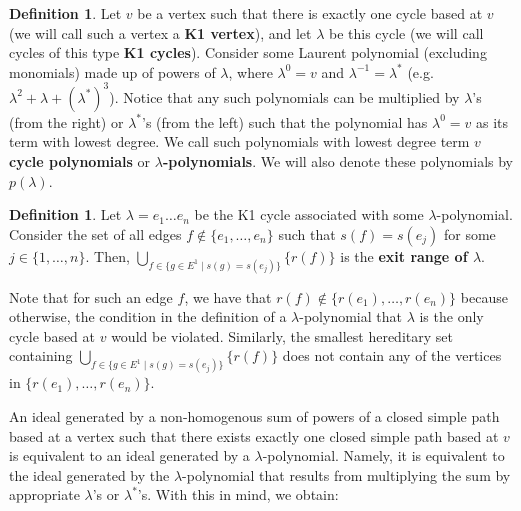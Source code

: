\documentclass[12pt]{amsart}
\theoremstyle{plain} \numberwithin{equation}{section}
\theoremstyle{definition}
\newtheorem{definition}[theorem]{Definition}
\theoremstyle{definition}
\begin{document}
\begin{definition}
   Let $v$ be a vertex such that there is exactly one cycle based at $v$ (we will call such a vertex a \textbf{K1 vertex}), and let $\lambda$ be this cycle (we will call cycles of this type \textbf{K1 cycles}). Consider some Laurent polynomial (excluding monomials) made up of powers of $\lambda$, where $\lambda^0 = v$ and $\lambda^{-1}=\lambda^*$ (e.g. $\lambda^2 + \lambda + (\lambda^*)^3$). Notice that any such polynomials can be multiplied by $\lambda$'s (from the right) or $\lambda^*$'s (from the left) such that the polynomial has $\lambda^0=v$ as its term with lowest degree. We call such polynomials with lowest degree term $v$ \textbf{cycle polynomials} or \textbf{$\lambda$-polynomials}. We will also denote these polynomials by $p(\lambda)$. 
\end{definition} 

\begin{definition}
    Let $\lambda = e_1\dots e_n$ be the K1 cycle associated with some $\lambda$-polynomial. Consider the set of all edges $f \notin \{e_1,\ldots,e_n\}$ such that $s(f) = s(e_j)$ for some $j \in\{1,\ldots,n\}$. Then, $\bigcup_{f\in\{g\in E^1 \mid s(g) = s(e_j)\}}\{r(f)\}$ is the \textbf{exit range of $\lambda$}.
\end{definition} 

Note that for such an edge $f$, we have that $r(f) \notin \{r(e_1),\ldots,r(e_n)\}$ because otherwise, the condition in the definition of a $\lambda$-polynomial that $\lambda$ is the only cycle based at $v$ would be violated. Similarly, the smallest hereditary set containing $\bigcup_{f\in\{g\in E^1 \mid s(g) = s(e_j)\}}\{r(f)\}$ does not contain any of the vertices in $\{r(e_1),\ldots,r(e_n)\}$.

An ideal generated by a non-homogenous sum of powers of a closed simple path based at a vertex such that there exists exactly one closed simple path based at $v$ is equivalent to an ideal generated by a $\lambda$-polynomial. Namely, it is equivalent to the ideal generated by the $\lambda$-polynomial that results from multiplying the sum by appropriate $\lambda$'s or $\lambda^*$'s. With this in mind, we obtain: 
\end{document}
